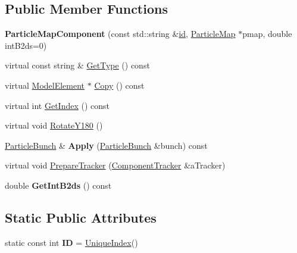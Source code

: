 \subsection*{Public Member Functions}
\begin{DoxyCompactItemize}
\item 
\mbox{\label{classParticleTracking_1_1ParticleMapComponent_a1e9effde99d68fab8ebba36ab08266b1}} 
{\bfseries Particle\+Map\+Component} (const std\+::string \&\hyperlink{classModelElement_aada171ead2085c75b592cf07d91bc5c2}{id}, \hyperlink{classParticleTracking_1_1ParticleMap}{Particle\+Map} $\ast$pmap, double int\+B2ds=0)
\item 
virtual const string \& \hyperlink{classParticleTracking_1_1ParticleMapComponent_ac16294b88ccb64111e35174e2c369b88}{Get\+Type} () const
\item 
virtual \hyperlink{classModelElement}{Model\+Element} $\ast$ \hyperlink{classParticleTracking_1_1ParticleMapComponent_ac5e2a2ba7a0d7e29d7dc0ee023e300b0}{Copy} () const
\item 
virtual int \hyperlink{classParticleTracking_1_1ParticleMapComponent_a7fbbdf569b4535569771f5fc19fc0c76}{Get\+Index} () const
\item 
virtual void \hyperlink{classParticleTracking_1_1ParticleMapComponent_a32c2b78fc4688e14006f906d5e321d10}{Rotate\+Y180} ()
\item 
\mbox{\label{classParticleTracking_1_1ParticleMapComponent_a65c42c28c28015a0620c20e6662454b6}} 
\hyperlink{classParticleTracking_1_1ParticleBunch}{Particle\+Bunch} \& {\bfseries Apply} (\hyperlink{classParticleTracking_1_1ParticleBunch}{Particle\+Bunch} \&bunch) const
\item 
virtual void \hyperlink{classParticleTracking_1_1ParticleMapComponent_a3490b4f7e961c402ce7eb42ab4e080d7}{Prepare\+Tracker} (\hyperlink{classComponentTracker}{Component\+Tracker} \&a\+Tracker)
\item 
\mbox{\label{classParticleTracking_1_1ParticleMapComponent_a57cbc233d0897e3f3b97393d7609f7bf}} 
double {\bfseries Get\+Int\+B2ds} () const
\end{DoxyCompactItemize}
\subsection*{Static Public Attributes}
\begin{DoxyCompactItemize}
\item 
\mbox{\label{classParticleTracking_1_1ParticleMapComponent_ab90f7bed946b47c91230219ec842fb51}} 
static const int {\bfseries ID} = \hyperlink{classAcceleratorComponent_aa7ad4d39e1a488b705983842ed1ac784}{Unique\+Index}()
\end{DoxyCompactItemize}

